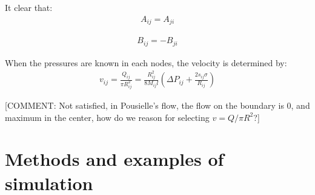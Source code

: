 \documentclass{crm-article}
\begin{document}
		It clear that:
		\begin{gather} \label{eq:symmetry-of-a}
			A_{ij} = A_{ji}
		\end{gather}
		
		\begin{gather} \label{eq:symmetry-of-b}
			B_{ij} = -B_{ji}
		\end{gather}
		
		When the pressures are known in each nodes, the velocity is determined by:
		\begin{gather} \label{eq:velocity-from-pressures}
			v_{ij} = \frac{Q_{ij}}{\pi R_{ij}^2} = \frac{R_{ij}^2}{8M_{ij}l} \left( \Delta P_{ij} + \frac{2s_{ij} \sigma}{R_{ij}} \right)
		\end{gather}
		
		[COMMENT: Not satisfied, in Pousielle's flow, the flow on the boundary is 0, and maximum in the center, how do we reason for selecting $v = Q/ \pi R^2$?]

		
	\section{Methods and examples of simulation} \label{sec:computation}	
\end{document}
